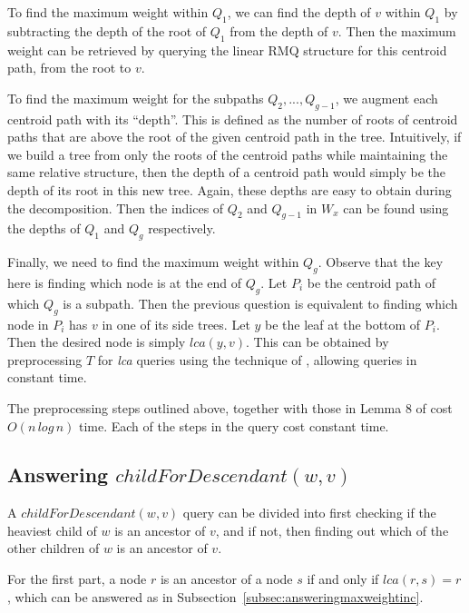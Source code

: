 \documentclass{article}
\begin{document}
    To find the maximum weight within $Q_1$, we can find the depth of $v$ within $Q_1$ by subtracting the depth of the root of $Q_1$ from the depth of $v$. Then the maximum weight can be retrieved by querying the linear RMQ structure for this centroid path, from the root to $v$.

    To find the maximum weight for the subpaths $Q_2, ..., Q_{g - 1}$, we augment each centroid path with its ``depth''. This is defined as the number of roots of centroid paths that are above the root of the given centroid path in the tree. Intuitively, if we build a tree from only the roots of the centroid paths while maintaining the same relative structure, then the depth of a centroid path would simply be the depth of its root in this new tree. Again, these depths are easy to obtain during the decomposition. Then the indices of $Q_2$ and $Q_{g-1}$ in $W_x$ can be found using the depths of $Q_1$ and $Q_g$ respectively.

    Finally, we need to find the maximum weight within $Q_g$. Observe that the key here is finding which node is at the end of $Q_g$. Let $P_i$ be the centroid path of which $Q_g$ is a subpath. Then the previous question is equivalent to finding which node in $P_i$ has $v$ in one of its side trees. Let $y$ be the leaf at the bottom of $P_i$. Then the desired node is simply $lca(y, v)$. This can be obtained by preprocessing $T$ for \textit{lca} queries using the technique of \cite{bender2000lca}, allowing queries in constant time.

    The preprocessing steps outlined above, together with those in Lemma 8 of \cite{jansson2018algorithms} cost $O(n\,log\,n)$ time. Each of the steps in the query cost constant time.

    \subsection{Answering $childForDescendant(w, v)$}
    \label{subsec:answeringcfd}

    A $childForDescendant(w, v)$ query can be divided into first checking if the heaviest child of $w$ is an ancestor of $v$, and if not, then finding out which of the other children of $w$ is an ancestor of $v$.

    For the first part, a node $r$ is an ancestor of a node $s$ if and only if $lca(r, s) = r$, which can be answered as in Subsection~\ref{subsec:answeringmaxweightinc}.
\end{document}
